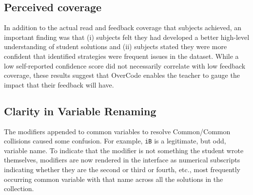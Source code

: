\subsection{Perceived coverage}
In addition to the actual read and feedback coverage that subjects achieved, an important finding was that (i) subjects felt they had developed a better high-level understanding of student solutions and (ii) subjects stated they were more confident that identified strategies were frequent issues in the dataset. While a low self-reported confidence score did not necessarily correlate with low feedback coverage, these results suggest that OverCode enables the teacher to gauge the impact that their feedback will have.




\subsection{Clarity in Variable Renaming}
The modifiers appended to common variables to resolve Common/Common collisions caused some confusion. For example, \texttt{iB} is a legitimate, but odd, variable name. To indicate that the modifier is not something the student wrote themselves, modifiers are now rendered in the interface as numerical subscripts indicating whether they are the second or third or fourth, etc., most frequently occurring common variable with that name across all the solutions in the collection.

